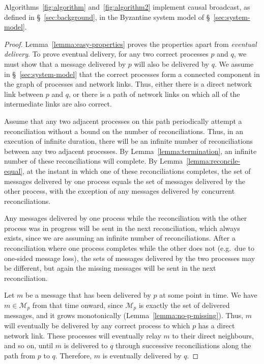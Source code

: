 \documentclass[a4paper,anonymous,USenglish]{lipics-v2019}
\begin{document}
\begin{theorem}
Algorithms~\ref{fig:algorithm} and~\ref{fig:algorithm2} implement causal broadcast, as defined in \S~\ref{sec:background}, in the Byzantine system model of \S~\ref{sec:system-model}.
\end{theorem}
\begin{proof}
Lemma~\ref{lemma:easy-properties} proves the properties apart from \emph{eventual delivery}.
To prove eventual delivery, for any two correct processes $p$ and $q$, we must show that a message delivered by $p$ will also be delivered by $q$.
We assume in \S~\ref{sec:system-model} that the correct processes form a connected component in the graph of processes and network links.
Thus, either there is a direct network link between $p$ and $q$, or there is a path of network links on which all of the intermediate links are also correct.

Assume that any two adjacent processes on this path periodically attempt a reconciliation without a bound on the number of reconciliations.
Thus, in an execution of infinite duration, there will be an infinite number of reconciliations between any two adjacent processes.
By Lemma~\ref{lemma:termination}, an infinite number of these reconciliations will complete.
By Lemma~\ref{lemma:reconcile-equal}, at the instant in which one of these reconciliations completes, the set of messages delivered by one process equals the set of messages delivered by the other process, with the exception of any messages delivered by concurrent reconciliations.

Any messages delivered by one process while the reconciliation with the other process was in progress will be sent in the next reconciliation, which always exists, since we are assuming an infinite number of reconciliations.
After a reconciliation where one process completes while the other does not (e.g.\ due to one-sided message loss), the sets of messages delivered by the two processes may be different, but again the missing messages will be sent in the next reconciliation.

Let $m$ be a message that has been delivered by $p$ at some point in time.
We have $m \in \mathcal{M}_p$ from that time onward, since $\mathcal{M}_p$ is exactly the set of delivered messages, and it grows monotonically (Lemma~\ref{lemma:no-p-missing}).
Thus, $m$ will eventually be delivered by any correct process to which $p$ has a direct network link.
These processes will eventually relay $m$ to their direct neighbours, and so on, until $m$ is delivered to $q$ through successive reconciliations along the path from $p$ to $q$.
Therefore, $m$ is eventually delivered by $q$.
\end{proof}
\end{document}
